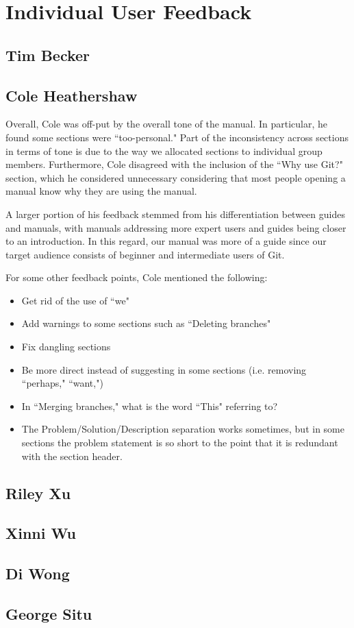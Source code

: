 \documentclass[11pt]{article}
\begin{document}
\section*{Individual User Feedback}

\subsection*{Tim Becker}

\subsection*{Cole Heathershaw}

Overall, Cole was off-put by the overall tone of the manual.  In particular, he found some sections were ``too-personal."  Part of the inconsistency across sections in terms of tone is due to the way we allocated sections to individual group members.  Furthermore, Cole disagreed with the inclusion of the ``Why use Git?" section, which he considered unnecessary considering that most people opening a manual know why they are using the manual.

A larger portion of his feedback stemmed from his differentiation between guides and manuals, with manuals addressing more expert users and guides being closer to an introduction.  In this regard, our manual was more of a guide since our target audience consists of beginner and intermediate users of Git.

For some other feedback points, Cole mentioned the following:
\begin{itemize}
    \item Get rid of the use of ``we"
    \item Add warnings to some sections such as ``Deleting branches"
    \item Fix dangling sections
    \item Be more direct instead of suggesting in some sections (i.e. removing ``perhaps," ``want,")
    \item In ``Merging branches," what is the word ``This" referring to?
    \item The Problem/Solution/Description separation works sometimes, but in some sections the problem statement is so short to the point that it is redundant with the section header.
\end{itemize}
\subsection*{Riley Xu}

\subsection*{Xinni Wu}

\subsection*{Di Wong}

\subsection*{George Situ}
\end{document}
